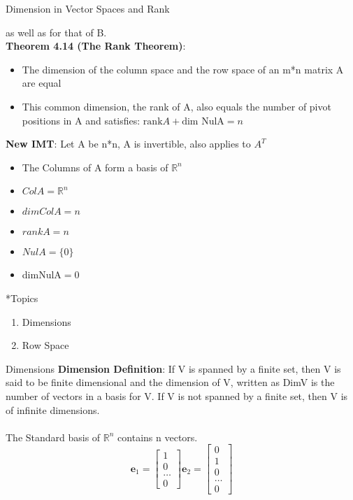 \documentclass[a4paper, 12pt]{article}
\begin{document}
\begin{section}{Dimension in Vector Spaces and Rank}
\begin{subsection}
as well as for that of B. \\
\noindent \textbf{Theorem 4.14 (The Rank Theorem)}:
\begin{itemize}
\item{The dimension of the column space and the row space of an m*n matrix A are equal}
\item{This common dimension, the rank of A, also equals the number of pivot positions
in A and satisfies: $\mbox{rank}A+\mbox{dim NulA}=n$} 
\end{itemize}
\noindent \textbf{New IMT}: Let A be n*n, A is invertible, also applies to $A^{T}$
\begin{itemize}
\item{The Columns of A form a basis of $\mathbb{R}^{n}$}
\item{$ColA=\mathbb{R}^{n}$}
\item{$dimColA=n$}
\item{$rankA=n$}
\item{$NulA=\{0\}$}
\item{dimNulA$=0$}
\end{itemize}
\end{subsection}
\begin{subsection}*{Topics}
\begin{enumerate}
\item{Dimensions}
\item{Row Space}
\end{enumerate}
\end{subsection}
\begin{subsection}{Dimensions}
\textbf{Dimension Definition}:	If V is spanned by a finite set,
then V is said to be finite dimensional and the dimension of V,
written as DimV is the number of vectors in a basis for V. If V is
not spanned by a finite set, then V is of infinite dimensions.\\
\\ The Standard basis of $\mathbb{R}^{n}$ contains n vectors.
\begin{equation}
\textbf{e}_{1}=\begin{bmatrix} 1\\ 0 \\ \dots \\ 0 \end{bmatrix}
\textbf{e}_{2}= \begin{bmatrix} 0\\ 1\\ 0\\ \dots \\ 0 \end{bmatrix}

\end{equation}
\end{subsection}
\end{section}
\end{document}
